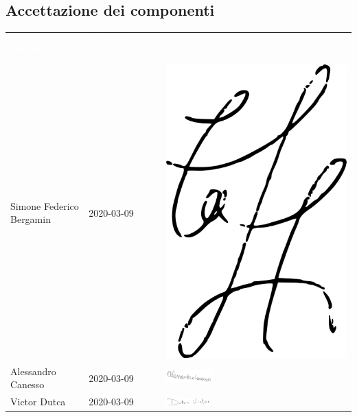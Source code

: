 \subsection{Accettazione dei componenti}
\begin{table}[H]	
	\begin{center}
	\begin{tabular}{ C{5cm} C{4cm} C{6cm}}
		\textcolor{white}{\textbf{Nominativo}} & \textcolor{white}{\textbf{Data di accettazione}} & \textcolor{white}{\textbf{Firma}} \\
		Simone Federico Bergamin & 2020-03-09 & \includegraphics[scale=0.4]{img/firme/bergamin.png}\\
		Alessandro Canesso & 2020-03-09 & \includegraphics[scale=0.3, width=0.25\textwidth]{img/firme/canesso.png}\\
		Victor Dutca & 2020-03-09 & \includegraphics[scale=0.3, width=0.25\textwidth]{img/firme/dutca.png}\\

\end{tabular}
\end{center}
\end{table}
